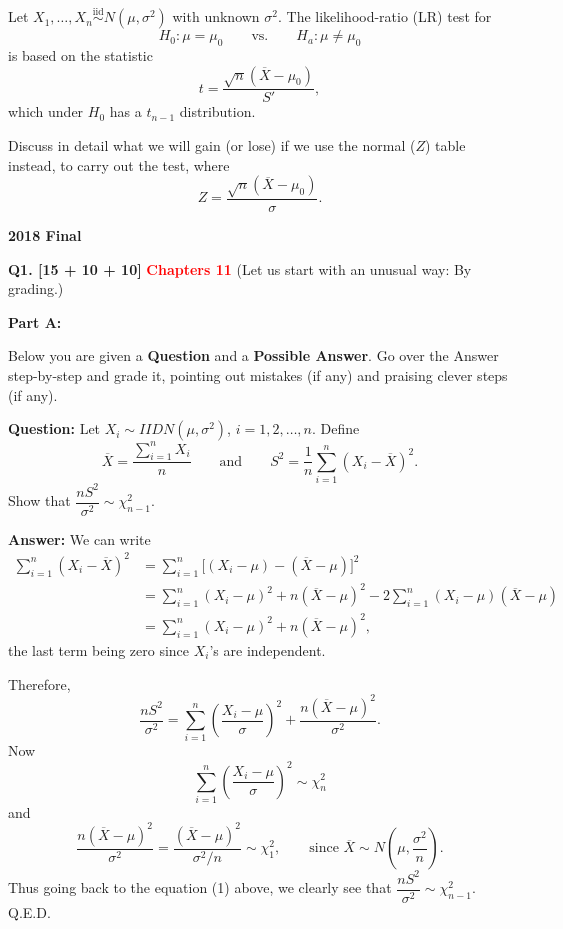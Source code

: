 \documentclass[11pt]{article}
\begin{document}
Let $X_1,\ldots,X_n\overset{\mathrm{iid}}{\sim}N(\mu,\sigma^2)$ with unknown $\sigma^2$. The likelihood-ratio (LR) test for
\[
H_0:\mu=\mu_0\qquad\text{vs.}\qquad H_a:\mu\neq\mu_0
\]
is based on the statistic
\[
t=\frac{\sqrt{n}(\overline{X}-\mu_0)}{S'},
\]
which under $H_0$ has a $t_{n-1}$ distribution.

Discuss in detail what we will gain (or lose) if we use the normal ($Z$) table instead, to carry out the test, where
\[
Z=\frac{\sqrt{n}(\overline{X}-\mu_0)}{\sigma}.
\]

\clearpage

\begin{center}
    {\Large\bfseries 2018 Final}
\end{center}

\vspace{1em}

\textbf{Q1. [15 + 10 + 10]} \textbf{\textcolor{red}{Chapters 11}} (Let us start with an unusual way: By grading.)

\textbf{Part A:}

Below you are given a \textbf{Question} and a \textbf{Possible Answer}. Go over the Answer step-by-step and grade it, pointing out mistakes (if any) and praising clever steps (if any).

\textbf{Question:} Let $X_i\sim IIDN(\mu,\sigma^2)$, $i=1,2,\ldots,n$. Define
\[
\overline X=\frac{\sum_{i=1}^{n}X_i}{n}
\qquad\text{and}\qquad
S^2=\frac{1}{n}\sum_{i=1}^n(X_i-\overline X)^2.
\]
Show that $\dfrac{nS^2}{\sigma^2}\sim\chi^2_{n-1}$.

\textbf{Answer:} We can write
\[
\begin{aligned}
\sum_{i=1}^n(X_i-\overline X)^2
&=\sum_{i=1}^n\bigl[(X_i-\mu)-(\overline X-\mu)\bigr]^2\\
&=\sum_{i=1}^n(X_i-\mu)^2+n(\overline X-\mu)^2
   -2\sum_{i=1}^n(X_i-\mu)(\overline X-\mu)\\
&=\sum_{i=1}^n(X_i-\mu)^2+n(\overline X-\mu)^2,
\end{aligned}
\]
the last term being zero since $X_i$'s are independent.

Therefore,
\begin{equation}
\frac{nS^2}{\sigma^2}
=\sum_{i=1}^n\left(\frac{X_i-\mu}{\sigma}\right)^2
+\frac{n(\overline X-\mu)^2}{\sigma^2}.
\tag{1}
\end{equation}
Now
\[
\sum_{i=1}^n\left(\frac{X_i-\mu}{\sigma}\right)^2\sim\chi_n^2
\]
and
\[
\frac{n(\overline X-\mu)^2}{\sigma^2}
=\frac{(\overline X-\mu)^2}{\sigma^2/n}\sim\chi_1^2,
\qquad\text{since }\overline X\sim N\left(\mu,\frac{\sigma^2}{n}\right).
\]
Thus going back to the equation (1) above, we clearly see that
$\dfrac{nS^2}{\sigma^2}\sim\chi_{n-1}^2$. Q.E.D.
\end{document}

